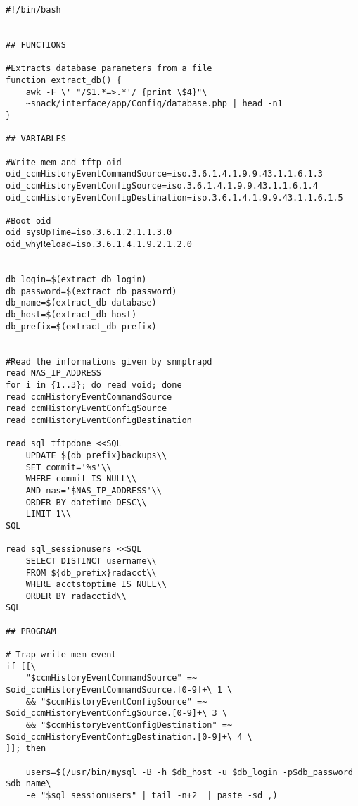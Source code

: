 \begin{lstlisting}
#!/bin/bash


## FUNCTIONS

#Extracts database parameters from a file
function extract_db() {
    awk -F \' "/$1.*=>.*'/ {print \$4}"\
	~snack/interface/app/Config/database.php | head -n1
}

## VARIABLES

#Write mem and tftp oid
oid_ccmHistoryEventCommandSource=iso.3.6.1.4.1.9.9.43.1.1.6.1.3
oid_ccmHistoryEventConfigSource=iso.3.6.1.4.1.9.9.43.1.1.6.1.4
oid_ccmHistoryEventConfigDestination=iso.3.6.1.4.1.9.9.43.1.1.6.1.5

#Boot oid
oid_sysUpTime=iso.3.6.1.2.1.1.3.0
oid_whyReload=iso.3.6.1.4.1.9.2.1.2.0


db_login=$(extract_db login)
db_password=$(extract_db password)
db_name=$(extract_db database)
db_host=$(extract_db host)
db_prefix=$(extract_db prefix)


#Read the informations given by snmptrapd
read NAS_IP_ADDRESS
for i in {1..3}; do read void; done
read ccmHistoryEventCommandSource
read ccmHistoryEventConfigSource
read ccmHistoryEventConfigDestination

read sql_tftpdone <<SQL
    UPDATE ${db_prefix}backups\\
    SET commit='%s'\\
    WHERE commit IS NULL\\
    AND nas='$NAS_IP_ADDRESS'\\
    ORDER BY datetime DESC\\
    LIMIT 1\\
SQL

read sql_sessionusers <<SQL
    SELECT DISTINCT username\\
    FROM ${db_prefix}radacct\\
    WHERE acctstoptime IS NULL\\
    ORDER BY radacctid\\
SQL

## PROGRAM

# Trap write mem event
if [[\
    "$ccmHistoryEventCommandSource" =~ $oid_ccmHistoryEventCommandSource.[0-9]+\ 1 \
    && "$ccmHistoryEventConfigSource" =~ $oid_ccmHistoryEventConfigSource.[0-9]+\ 3 \
    && "$ccmHistoryEventConfigDestination" =~ $oid_ccmHistoryEventConfigDestination.[0-9]+\ 4 \
]]; then

    users=$(/usr/bin/mysql -B -h $db_host -u $db_login -p$db_password $db_name\
	-e "$sql_sessionusers" | tail -n+2  | paste -sd ,)


\end{lstlisting}

